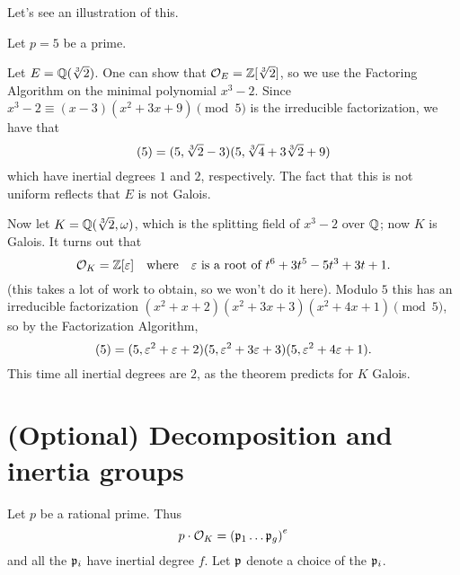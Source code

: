 Let's see an illustration of this.
\begin{example}
	Let $p = 5$ be a prime.
	\begin{enumerate}[(a)]
		\ii Let $E = \mathbb Q(\sqrt[3]{2})$.
		One can show that $\mathcal O_E = \mathbb Z[\sqrt[3]{2}]$, so 
		we use the Factoring Algorithm on the minimal polynomial $x^3-2$.
		Since $x^3-2 \equiv (x-3)(x^2+3x+9) \pmod 5$ is the irreducible factorization,
		we have that
		\[ (5) = (5,\sqrt[3]{2}-3)(5, \sqrt[3]{4}+3\sqrt[3]{2}+9) \]
		which have inertial degrees $1$ and $2$, respectively.
		The fact that this is not uniform reflects that $E$ is not Galois.

		\ii Now let $K = \mathbb Q(\sqrt[3]{2},\omega)$, which is the splitting
		field of $x^3-2$ over $\mathbb Q$; now $K$ is Galois.
		It turns out that
		\[ \mathcal O_K = \mathbb Z[\varepsilon] \quad\text{where}\quad \varepsilon \text { is a root of } t^6+3t^5-5t^3+3t+1. \]
		(this takes a lot of work to obtain, so we won't do it here).
		Modulo $5$ this has an irreducible factorization
		$(x^2+x+2)(x^2+3x+3)(x^2+4x+1) \pmod 5$,
		so by the Factorization Algorithm,
		\[ (5) = (5, \varepsilon^2+\varepsilon+2)(5, \varepsilon^2+3\varepsilon+3)(5, \varepsilon^2+4\varepsilon+1). \]
		This time all inertial degrees are $2$, as the theorem predicts for $K$ Galois.
	\end{enumerate}
\end{example}

\section{(Optional) Decomposition and inertia groups}
Let $p$ be a rational prime.
Thus
\[ p \cdot \mathcal O_K = \left( \mathfrak p_1 \dots \mathfrak p_g \right)^e \]
and all the $\mathfrak p_i$ have inertial degree $f$.
Let $\mathfrak p$ denote a choice of the $\mathfrak p_i$.

